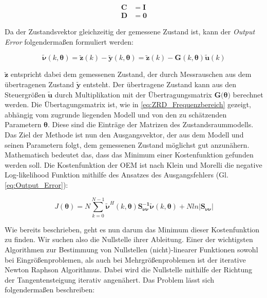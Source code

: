 \begin{align}
	\mathbf{C} &= \mathbf{I} \nonumber \\
 	\mathbf{D} &= \mathbf{0}          
	\label{eq:CD}
\end{align}

Da der Zustandsvektor gleichzeitig der gemessene Zustand ist, kann der \textit{Output Error} folgendermaßen formuliert werden:

\begin{equation}
    \mathbf{\tilde{\nu}}(k,\mathbf{\theta}) = \mathbf{\tilde{z}}(k)-\mathbf{\tilde{y}}(k,\mathbf{\theta}) = \mathbf{\tilde{z}}(k)-\mathbf{G}(k,\mathbf{\theta})\mathbf{\tilde{u}}(k)  
	\label{eq:Output_Error}
\end{equation}

$\mathbf{\tilde{z}}$ entspricht dabei dem gemessenen Zustand, der durch Messrauschen aus dem 
übertragenen Zustand 
$\mathbf{\tilde{y}}$ entsteht. Der übertragene Zustand kann aus den Steuergrößen $\mathbf{\tilde{u}}$ durch Multiplikation 
mit der Übertragungsmatrix $\mathbf{G}(\mathbf{\theta)}$ berechnet werden. Die Übertagungsmatrix ist, wie in 
\cref{eq:ZRD_Frequenzbereich} gezeigt, abhängig vom zugrunde liegenden Modell und von den zu schätzenden Parametern 
$\mathbf{\theta}$. Diese sind die Einträge der Matrizen des Zustandsraummodells. Das Ziel der Methode ist nun den Ausgangsvektor, der aus dem Modell und seinen Parametern folgt, dem gemessenen Zustand möglichst gut anzunähern. Mathematisch bedeutet das, dass das Minimum einer Kostenfunktion gefunden werden soll. Die Kostenfunktion der OEM ist nach Klein und Morelli \cite{Klein2006} die negative Log-likelihood Funktion mithilfe des Ansatzes des Ausgangsfehlers (Gl. \ref{eq:Output_Error}):

 \begin{equation}
    J(\mathbf{\theta})=N \sum\limits_{k=0}^{N-1}\mathbf{\tilde{\nu}}^H(k,\mathbf{\theta})\mathbf{S_{\nu\nu}^{-1}}\mathbf{\tilde{\nu}}(k,\mathbf{\theta})+Nln|\mathbf{S_{\nu\nu}}|
	\label{eq:Kostenfunktion}
\end{equation}  

Wie bereits beschrieben, geht es nun darum das Minimum dieser Kostenfunktion zu finden. Wir suchen also die Nullstelle ihrer Ableitung. Einer der wichtigsten Algorithmen zur Bestimmung von Nullstellen (nicht)-linearer Funktionen sowohl bei Eingrößenproblemen, als auch bei Mehrgrößenproblemen ist der iterative Newton Raphson Algorithmus. Dabei wird die Nullstelle mithilfe der Richtung der Tangentensteigung iterativ angenähert. Das Problem lässt sich folgendermaßen beschreiben: \noindent \\

